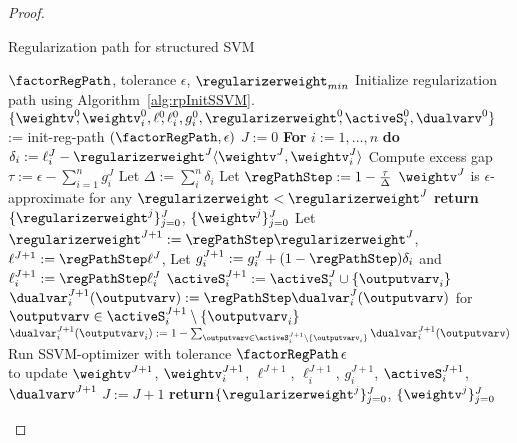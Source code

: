 \documentclass{article}
\begin{document}
\begin{proof}
\begin{algorithm}[t!]
    \caption{Regularization path for structured SVM}
    \label{alg:rpAlgorithmSSVM}
    \begin{algorithmic}[1]
        \INPUT $\factorRegPath$, tolerance $\epsilon$, $\regularizerweight_{min}$
        \STATE Initialize regularization path using Algorithm~\ref{alg:rpInitSSVM}. $\{\weightv^0\!\!, \weightv_i^0, \ell^0\!\!, \ell_i^0, g_i^0, \regularizerweight^0\!\!, \activeS_i^0, \dualvarv^0 \}$ \!:=\! {\sc init-reg-path} $(\factorRegPath, \epsilon)$
        \STATE $J := 0$
        \REPEAT
        \STATE \textbf{For}\; $i := 1,\dots,n$ \;\textbf{do}\; $\delta_i := \ell_i^J -\regularizerweight^J \langle\weightv^J, \weightv_i^J\rangle $
        \STATE Compute excess gap\; $\tau := \epsilon - \sum_{i=1}^n g_i^J$
        \STATE Let\; $\Delta := \sum_i^{n} \delta_i$
        \IF{$\Delta \leq  \tau$}
        \STATE Let $\regPathStep := 1 - \frac{\tau}{\Delta}$
        \ELSE
        \STATE $\weightv^J$ is $\epsilon$-approximate for any $\regularizerweight < \regularizerweight^J$
        \STATE \textbf{return}\quad$\{\regularizerweight^j\}_{j=0}^J$, $\{\weightv^j\}_{j=0}^J$
        \ENDIF
        \STATE Let\; $\regularizerweight^{J+1} := \regPathStep\regularizerweight^{J}$,\; $\ell^{J+1} := \regPathStep\ell^{J}$,\; 
         
        \STATE Let\; $g^{J+1}_i := g^{J}_i + (1 - \regPathStep ) \delta_i$ \; and \; $\ell_i^{J+1} := \regPathStep\ell_i^{J}$
        \ENDFOR
          \label{alg:rpAlgorithmSSVM:activeSetBegin}
            \STATE $\activeS_i^{J+1} := \activeS_i^{J} \cup \{\outputvarv_i\}$
            \STATE $\dualvar_i^{J+1}(\outputvarv) := \regPathStep \dualvar_i^{J}(\outputvarv)$ for  $\outputvarv \in \activeS_i^{J+1} \setminus \{\outputvarv_i\}$
            \STATE $\dualvar_i^{J+1}(\outputvarv_i):=1-\sum_{\outputvarv \in \activeS_i^{J+1}\setminus \{\outputvarv_i\}} \dualvar_i^{J+1}(\outputvarv)$
        \ENDFOR \label{alg:rpAlgorithmSSVM:activeSetEnd}
        \STATE Run SSVM-optimizer with tolerance $\factorRegPath\,\epsilon$ \label{alg:rpAlgorithmSSVM:SSVM} \\ \quad\; to update $\weightv^{J+1}$\!\!, $\weightv_i^{J+1}$\!\!, $\ell^{J+1}$\!\!, $\ell_i^{J+1}$\!\!, $g_i^{J+1}$\!\!, $\activeS_i^{J+1}$\!\!, $\dualvarv^{J+1}$\!\! 
        \STATE $J := J+1$
        \STATE \textbf{return}\quad$\{\regularizerweight^j\}_{j=0}^J$, $\{\weightv^j\}_{j=0}^J$
    \end{algorithmic}
\end{algorithm}


\end{proof}
\end{document}
